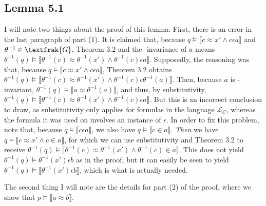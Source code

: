 \documentclass{article}
\newcommand{\lbc}{\llbracket}
\newcommand{\rbc}{\rrbracket}
\theoremstyle{definition}
\begin{document}
\subsection*{Lemma 5.1}
I will note two things about the proof of this lemma. First, there is an error in the last paragraph of part (1). It is claimed that, 
because $q\vDash\lbc c\approx x'\wedge c\epsilon a\rbc$ and $\theta^{-1}\in\textfrak{G}$, Theorem 3.2 and the
-invariance of $a$ means
$\theta^{-1}(q)\vDash\lbc\theta^{-1}(c)\approx\theta^{-1}(x')\wedge\theta^{-1}(c)\epsilon a\rbc$. 
Supposedly, the reasoning was that, because $q\vDash\lbc c\approx x'\wedge c\epsilon a\rbc$,
Theorem 3.2 obtains
$\theta^{-1}(q)\vDash\lbc\theta^{-1}(c)\approx\theta^{-1}(x')\wedge\theta^{-1}(c)\epsilon\theta^{-1}(a)\rbc$. Then,
because $a$ is -invariant, $\theta^{-1}(q)\vDash\lbc a\approx\theta^{-1}(a)\rbc$, and thus, by substitutivity,
$\theta^{-1}(q)\vDash\lbc\theta^{-1}(c)\approx\theta^{-1}(x')\wedge\theta^{-1}(c)\epsilon a\rbc$. But this is an incorrect 
conclusion to draw, as substitutivity only applies for formulas in the language $\mathcal{L}_C$, whereas the formula 
it was used on involves an instance of $\epsilon$. In order to fix this problem, note that, because 
$q\vDash\lbc c\epsilon a\rbc$, we also have $q\vDash\lbc c\in a\rbc$. \textit{Then} we have
$q\vDash\lbc c\approx x'\wedge c\in a\rbc$, for which we can use substitutivity and Theorem 3.2 to receive
$\theta^{-1}(q)\vDash\lbc\theta^{-1}(c)\approx\theta^{-1}(x')\wedge\theta^{-1}(c)\in a\rbc$. This does not 
yield $\theta^{-1}(q)\vDash\theta^{-1}(x')\epsilon b$ as in the proof, but it can easily be seen to yield
$\theta^{-1}(q)\vDash\lbc\theta^{-1}(x')\epsilon b\rbc$, which is what is actually needed.

The second thing I will note are the details for part (2) of the proof, where we show that $p\vDash\lbc a\approx b\rbc$. 
\end{document}
